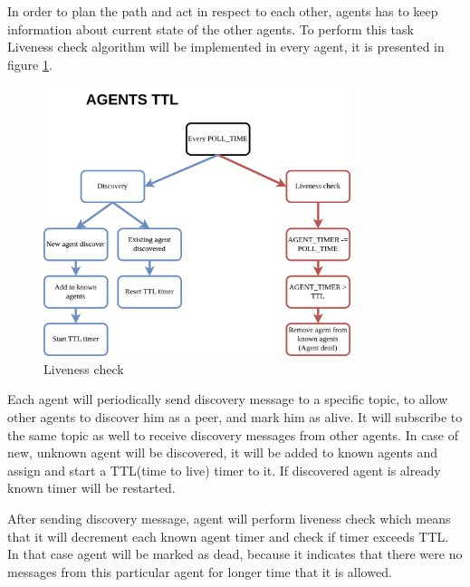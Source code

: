 In order to plan the path and act in respect to each other, agents has to keep information about current state of the other agents. To perform this task Liveness check algorithm will be implemented in every agent, it is presented in figure \ref{fig:liveness_check}.
\begin{figure}[H]
    \centering
    \includegraphics[width=0.8\textwidth]{pictures/agent_ttl.png}
    \caption{ Liveness check }
    \label{fig:liveness_check}
\end{figure}

Each agent will periodically send discovery message to a specific topic, to allow other agents to discover him as a peer, and mark him as alive. It will subscribe to the same topic as well to receive discovery messages from other agents. In case of new, unknown agent will be discovered, it will be added to known agents and assign and start a TTL(time to live) timer to it. If discovered agent is already known timer will be restarted.

After sending discovery message, agent will perform liveness check which means that it will decrement each known agent timer and check if timer exceeds TTL. In that case agent will be marked as dead, because it indicates that there were no messages from this particular agent for longer time that it is allowed.
